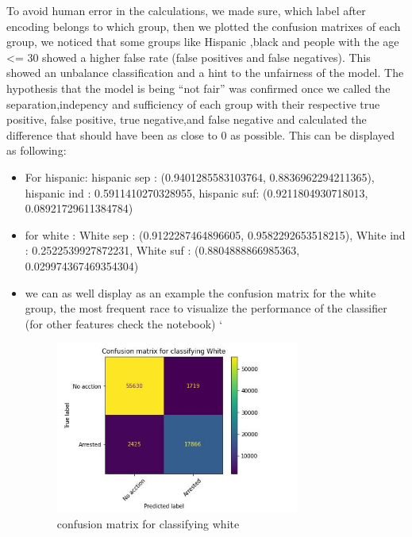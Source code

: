 \documentclass[doctype=studienarbeit,lang=english,BCOR=15mm,biblatex]{ldvbook}
\begin{document}
To avoid human error in the calculations, we made sure, which label after encoding belongs to which group, then we plotted the confusion matrixes of each group, we noticed that some groups like Hispanic ,black and people with the age <= 30 showed a higher false rate (false positives and false negatives). This showed an unbalance classification and a hint to the unfairness of the model. The hypothesis that the model is being “not fair” was confirmed once we called the separation,indepency and sufficiency of each group with their respective true positive, false positive, true negative,and false negative and calculated the difference that should have been as close to 0 as possible. 
This can be displayed as following: 
\begin{itemize}
    \item For hispanic: hispanic sep : (0.9401285583103764, 0.8836962294211365),
hispanic ind : 0.5911410270328955,
hispanic suf: (0.9211804930718013, 0.08921729611384784)
    \item for white : White sep :  (0.9122287464896605, 0.9582292653518215),
    White ind : 0.2522539927872231,
    White suf : (0.8804888866985363, 0.029974367469354304)
    \item we can as well display as an example the confusion matrix for the white group, the most frequent race to visualize the performance of the classifier (for other features check the notebook)
`\begin{figure}[h]
    \centering
    \includegraphics[width=8cm]{white.JPG}
    \caption[8cm]{confusion matrix for classifying white }
    \label{fig:whitebefore}
\end{figure}
\end{itemize}
\end{document}
